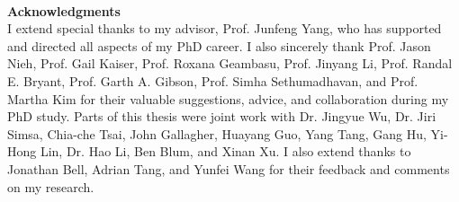 ~\\[1in] %
\textbf{\Huge Acknowledgments}\\

\noindent 
I extend special thanks to my advisor, Prof. Junfeng Yang, who has supported 
and directed all aspects of my PhD career. I also sincerely thank Prof. Jason 
Nieh, Prof. Gail Kaiser, Prof. Roxana Geambasu, Prof. Jinyang Li, Prof. Randal 
E. Bryant, Prof. Garth A. Gibson, Prof. Simha Sethumadhavan, and Prof. Martha 
Kim for their valuable suggestions, advice, and collaboration during my PhD 
study. Parts of this thesis were joint work with Dr. Jingyue Wu, Dr. Jiri 
Simsa, Chia-che Tsai, John Gallagher, Huayang Guo, Yang Tang, Gang Hu, Yi-Hong 
Lin, Dr. Hao Li,  Ben Blum, and Xinan Xu. I also extend thanks to Jonathan 
Bell, Adrian Tang, and Yunfei Wang for their feedback and comments on my research.

